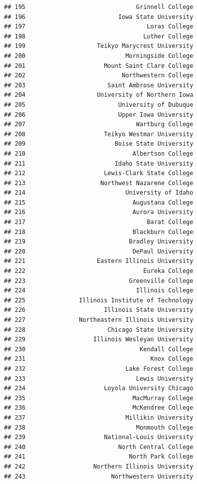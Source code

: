 \documentclass[]{article}
\begin{document}
\begin{verbatim}
## 195                               Grinnell College
## 196                          Iowa State University
## 197                                  Loras College
## 198                                 Luther College
## 199                    Teikyo Marycrest University
## 200                            Morningside College
## 201                      Mount Saint Clare College
## 202                           Northwestern College
## 203                       Saint Ambrose University
## 204                    University of Northern Iowa
## 205                          University of Dubuque
## 206                          Upper Iowa University
## 207                               Wartburg College
## 208                      Teikyo Westmar University
## 209                         Boise State University
## 210                              Albertson College
## 211                         Idaho State University
## 212                      Lewis-Clark State College
## 213                     Northwest Nazarene College
## 214                            University of Idaho
## 215                              Augustana College
## 216                              Aurora University
## 217                                  Barat College
## 218                              Blackburn College
## 219                             Bradley University
## 220                              DePaul University
## 221                    Eastern Illinois University
## 222                                 Eureka College
## 223                             Greenville College
## 224                               Illinois College
## 225               Illinois Institute of Technology
## 226                      Illinois State University
## 227               Northeastern Illinois University
## 228                       Chicago State University
## 229                   Illinois Wesleyan University
## 230                                Kendall College
## 231                                   Knox College
## 232                            Lake Forest College
## 233                               Lewis University
## 234                      Loyola University Chicago
## 235                              MacMurray College
## 236                              McKendree College
## 237                            Millikin University
## 238                               Monmouth College
## 239                      National-Louis University
## 240                          North Central College
## 241                             North Park College
## 242                   Northern Illinois University
## 243                        Northwestern University

\end{verbatim}
\end{document}
